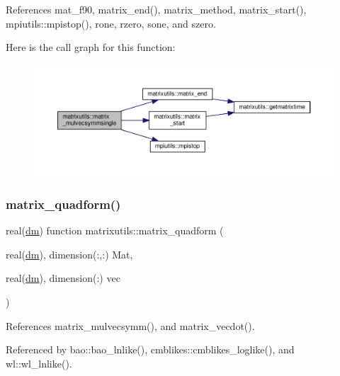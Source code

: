 References mat\+\_\+f90, matrix\+\_\+end(), matrix\+\_\+method, matrix\+\_\+start(), mpiutils\+::mpistop(), rone, rzero, sone, and szero.

Here is the call graph for this function\+:
\nopagebreak
\begin{figure}[H]
\begin{center}
\leavevmode
\includegraphics[width=350pt]{namespacematrixutils_a83ffeb3e4788ff67e17e5f94b70bec3a_cgraph}
\end{center}
\end{figure}
\mbox{\label{namespacematrixutils_affa7bde611de578a07d5a1bdf612f1b2}} 
\subsubsection{\texorpdfstring{matrix\+\_\+quadform()}{matrix\_quadform()}}
{\footnotesize\ttfamily real(\mbox{\hyperlink{namespacematrixutils_a7bdc564986ea4d90f51201c75606ef3d}{dm}}) function matrixutils\+::matrix\+\_\+quadform (\begin{DoxyParamCaption}\item[{real(\mbox{\hyperlink{namespacematrixutils_a7bdc564986ea4d90f51201c75606ef3d}{dm}}), dimension(\+:,\+:)}]{Mat,  }\item[{real(\mbox{\hyperlink{namespacematrixutils_a7bdc564986ea4d90f51201c75606ef3d}{dm}}), dimension(\+:)}]{vec }\end{DoxyParamCaption})}



References matrix\+\_\+mulvecsymm(), and matrix\+\_\+vecdot().



Referenced by bao\+::bao\+\_\+lnlike(), cmblikes\+::cmblikes\+\_\+loglike(), and wl\+::wl\+\_\+lnlike().

